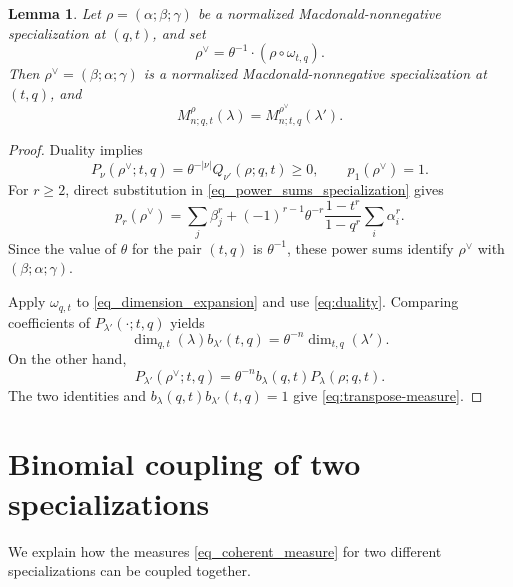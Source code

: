 \documentclass[11pt,reqno]{amsart}
\newtheorem{lemma}[theorem]{Lemma}
\theoremstyle{definition}
\theoremstyle{remark}
\numberwithin{equation}{section}
\newcommand{\ddim}{\operatorname{dim}_{q,t}}
\newcommand{\tdim}{\operatorname{dim}_{t,q}}
\begin{document}
\begin{lemma}\label{lem:transposition}
Let $\rho=(\alpha;\beta;\gamma)$ be a normalized Macdonald-nonnegative
specialization at $(q,t)$, and set
\begin{equation}\label{eq:rho-dual}
 \rho^\vee=\theta^{-1}\cdot(\rho\circ\omega_{t,q}).
\end{equation}
Then $\rho^\vee=(\beta;\alpha;\gamma)$ is a normalized Macdonald-nonnegative
specialization at $(t,q)$, and
\begin{equation}\label{eq:transpose-measure}
 M_{n;q,t}^\rho(\lambda)=M_{n;t,q}^{\rho^\vee}(\lambda').
\end{equation}
\end{lemma}

\begin{proof}
Duality implies
\[
 P_\nu(\rho^\vee;t,q)
 =\theta^{-|\nu|}Q_{\nu'}(\rho;q,t)\ge0,
 \qquad p_1(\rho^\vee)=1.
\]
For $r\ge2$, direct substitution in \eqref{eq_power_sums_specialization} gives
\[
 p_r(\rho^\vee)=\sum_j\beta_j^r+
 (-1)^{r-1}\theta^{-r}\frac{1-t^r}{1-q^r}\sum_i\alpha_i^r.
\]
Since the value of $\theta$ for the pair $(t,q)$ is $\theta^{-1}$,
these power sums identify $\rho^\vee$ with $(\beta;\alpha;\gamma)$.

Apply $\omega_{q,t}$ to \eqref{eq_dimension_expansion} and use
\eqref{eq:duality}. Comparing coefficients of $P_{\lambda'}(\cdot;t,q)$
yields
\[
 \ddim(\lambda)b_{\lambda'}(t,q)=\theta^{-n}\tdim(\lambda').
\]
On the other hand,
\[
 P_{\lambda'}(\rho^\vee;t,q)
 =\theta^{-n}b_\lambda(q,t)P_\lambda(\rho;q,t).
\]
The two identities and $b_\lambda(q,t)b_{\lambda'}(t,q)=1$ give
\eqref{eq:transpose-measure}.
\end{proof}

\section{Binomial coupling of two specializations}\label{Section_binomial_coupling}

We explain how the measures \eqref{eq_coherent_measure} for two different specializations can be coupled together.
\end{document}
